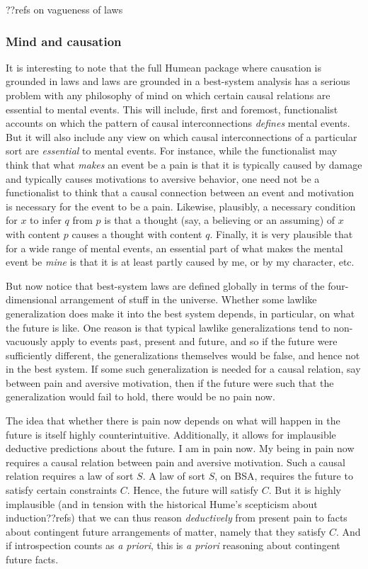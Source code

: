 ??refs on vagueness of laws

\subsubsection{Mind and causation}
It is interesting to note that the full Humean package where causation is grounded in laws and laws are grounded in a best-system 
analysis has a serious problem with any philosophy of mind on which certain causal relations are essential to mental events. This will
include, first and foremost, functionalist accounts on which the pattern of causal interconnections \textit{defines} mental events.
But it will also include any view on which causal interconnections of a particular sort are \textit{essential} to mental events.
For instance, while the functionalist may think that what \textit{makes} an event be a pain is that it is typically caused by
damage and typically causes motivations to aversive behavior, one need not be a functionalist to think that a causal connection between 
an event and motivation is necessary for the event to be a pain. Likewise, plausibly, a necessary condition for $x$ to
infer $q$ from $p$ is that a thought (say, a believing or an assuming) of $x$ with content $p$ causes a thought with content $q$. Finally, it is very
plausible that for a wide range of mental events, an essential part of what makes the mental event be \textit{mine} is that it is 
at least partly caused by me, or by my character, etc. 

But now notice that best-system laws are defined globally in terms of the four-dimensional arrangement of stuff in the universe. 
Whether some lawlike generalization does make it into the best system depends, in particular, on what the future is like. One reason 
is that typical lawlike generalizations tend to non-vacuously apply to events past, present and future, and so if the future 
were sufficiently different, the generalizations themselves would be false, and hence not in the best system. If some such generalization
is needed for a causal relation, say between pain and aversive motivation, then if the future were such that the generalization would fail
to hold, there would be no pain now. 

The idea that whether there is pain now depends on what will happen in the future is itself highly counterintuitive. Additionally, it 
allows for implausible deductive predictions about the future. I am in pain now. My being in pain now requires a causal relation between
pain and aversive motivation. Such a causal relation requires a law of sort $S$. A law of sort $S$, on BSA, requires the future
to satisfy certain constraints $C$. Hence, the future will satisfy $C$. But it is highly implausible (and in tension with the 
historical Hume's scepticism about induction??refs) that we can thus reason \textit{deductively} from present pain to facts about contingent future arrangements
of matter, namely that they satisfy $C$. And if introspection counts as \textit{a priori}, this is \textit{a priori} reasoning about contingent future facts.

